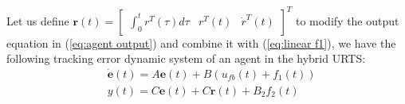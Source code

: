 \documentclass[journal,12pt,onecolumn,draftclsnofoot,]{IEEEtran}
\begin{document}
Let us define $\pmb{r}(t)=\begin{bmatrix}
    \int_{0}^{t}r^T(\tau)d\tau & r^T(t) & \dot{r}^T(t)
\end{bmatrix}^T$ to modify the output equation in (\ref{eq:agent output}) and combine it with (\ref{eq:linear f1}), we have the following tracking error dynamic system of an agent in the hybrid URTS:
\begin{equation} \label{eq:error}
    \begin{split}
        & \dot{\pmb{e}}(t)=A\pmb{e}(t)+B(u_{fb}(t)+f_1(t)) \\
        & y(t) = C\pmb{e}(t) + C\pmb{r}(t) + B_2f_2(t)   
    \end{split}  
\end{equation}
\end{document}
